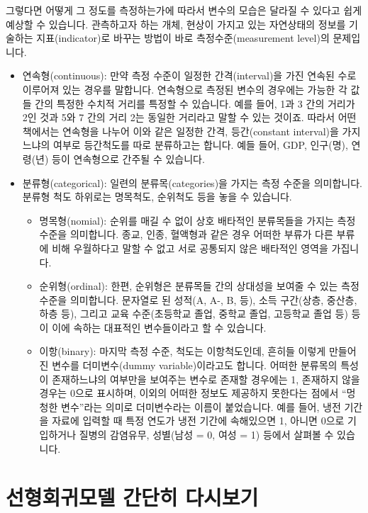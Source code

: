 \documentclass[
]{book}
\begin{document}
그렇다면 어떻게 그 정도를 측정하는가에 따라서 변수의 모습은 달라질 수 있다고 쉽게 예상할 수 있습니다. 관측하고자 하는 개체, 현상이 가지고 있는 자연상태의 정보를 기술하는 지표(indicator)로 바꾸는 방법이 바로 측정수준(measurement level)의 문제입니다.

\begin{itemize}
\item
  연속형(continuous): 만약 측정 수준이 일정한 간격(interval)을 가진 연속된 수로 이루어져 있는 경우를 말합니다. 연속형으로 측정된 변수의 경우에는 가능한 각 값들 간의 특정한 수치적 거리를 특정할 수 있습니다. 예를 들어, 1과 3 간의 거리가 2인 것과 5와 7 간의 거리 2는 동일한 거리라고 말할 수 있는 것이죠. 따라서 어떤 책에서는 연속형을 나누어 이와 같은 일정한 간격, 등간(constant interval)을 가지느냐의 여부로 등간척도를 따로 분류하고는 합니다. 예들 들어, GDP, 인구(명), 연령(년) 등이 연속형으로 간주될 수 있습니다.
\item
  분류형(categorical): 일련의 분류목(categories)을 가지는 측정 수준을 의미합니다. 분류형 척도 하위로는 명목척도, 순위척도 등을 놓을 수 있습니다.

  \begin{itemize}
  \item
    명목형(nomial): 순위를 매길 수 없이 상호 배타적인 분류목들을 가지는 측정 수준을 의미합니다. 종교, 인종, 혈액형과 같은 경우 어떠한 부류가 다른 부류에 비해 우월하다고 말할 수 없고 서로 공통되지 않은 배타적인 영역을 가집니다.
  \item
    순위형(ordinal): 한편, 순위형은 분류목들 간의 상대성을 보여줄 수 있는 측정수준을 의미합니다. 문자열로 된 성적(A, A-, B, 등), 소득 구간(상층, 중산층, 하층 등), 그리고 교육 수준(초등학교 졸업, 중학교 졸업, 고등학교 졸업 등) 등이 이에 속하는 대표적인 변수들이라고 할 수 있습니다.
  \item
    이항(binary): 마지막 측정 수준, 척도는 이항척도인데, 흔히들 이렇게 만들어진 변수를 더미변수(dummy variable)이라고도 합니다. 어떠한 분류목의 특성이 존재하느냐의 여부만을 보여주는 변수로 존재할 경우에는 1, 존재하지 않을 경우는 0으로 표시하며, 이외의 어떠한 정보도 제공하지 못한다는 점에서 ``멍청한 변수''라는 의미로 더미변수라는 이름이 붙었습니다. 예를 들어, 냉전 기간을 자료에 입력할 때 특정 연도가 냉전 기간에 속해있으면 1, 아니면 0으로 기입하거나 질병의 감염유무, 성별(남성 = 0, 여성 = 1) 등에서 살펴볼 수 있습니다.
  \end{itemize}
\end{itemize}

\hypertarget{uxc120uxd615uxd68cuxadc0uxbaa8uxb378-uxac04uxb2e8uxd788-uxb2e4uxc2dcuxbcf4uxae30}{%
\section{선형회귀모델 간단히 다시보기}\label{uxc120uxd615uxd68cuxadc0uxbaa8uxb378-uxac04uxb2e8uxd788-uxb2e4uxc2dcuxbcf4uxae30}}
\end{document}

